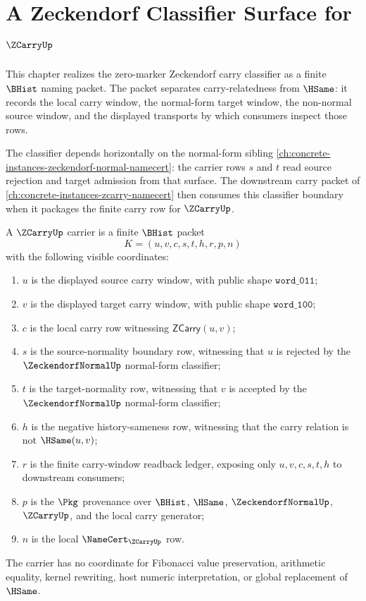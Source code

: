 \chapter{A Zeckendorf Classifier Surface for $\ZCarryUp$}
\label{ch:concrete-instances-zeckendorf-carry-classifier-namecert}

This chapter realizes the zero-marker Zeckendorf carry classifier as a finite $\BHist$ naming packet. The packet separates carry-relatedness from $\HSame$: it records the local carry window, the normal-form target window, the non-normal source window, and the displayed transports by which consumers inspect those rows.

The classifier depends horizontally on the normal-form sibling \autoref{ch:concrete-instances-zeckendorf-normal-namecert}: the carrier rows $s$ and $t$ read source rejection and target admission from that surface. The downstream carry packet of \autoref{ch:concrete-instances-zcarry-namecert} then consumes this classifier boundary when it packages the finite carry row for $\ZCarryUp$.

\begin{definition}
\label{def:zeckendorf-carry-classifier-carrier}
A $\ZCarryUp$ carrier is a finite $\BHist$ packet
$$
K=(u,v,c,s,t,h,r,p,n)
$$
with the following visible coordinates:
\begin{enumerate}
\item $u$ is the displayed source carry window, with public shape $\mathtt{word\_011}$;
\item $v$ is the displayed target carry window, with public shape $\mathtt{word\_100}$;
\item $c$ is the local carry row witnessing $\mathsf{ZCarry}(u,v)$;
\item $s$ is the source-normality boundary row, witnessing that $u$ is rejected by the $\ZeckendorfNormalUp$ normal-form classifier;
\item $t$ is the target-normality row, witnessing that $v$ is accepted by the $\ZeckendorfNormalUp$ normal-form classifier;
\item $h$ is the negative history-sameness row, witnessing that the carry relation is not $\HSame(u,v)$;
\item $r$ is the finite carry-window readback ledger, exposing only $u,v,c,s,t,h$ to downstream consumers;
\item $p$ is the $\Pkg$ provenance over $\BHist$, $\HSame$, $\ZeckendorfNormalUp$, $\ZCarryUp$, and the local carry generator;
\item $n$ is the local $\NameCert_{\ZCarryUp}$ row.
\end{enumerate}
The carrier has no coordinate for Fibonacci value preservation, arithmetic equality, kernel rewriting, host numeric interpretation, or global replacement of $\HSame$.
\end{definition}

